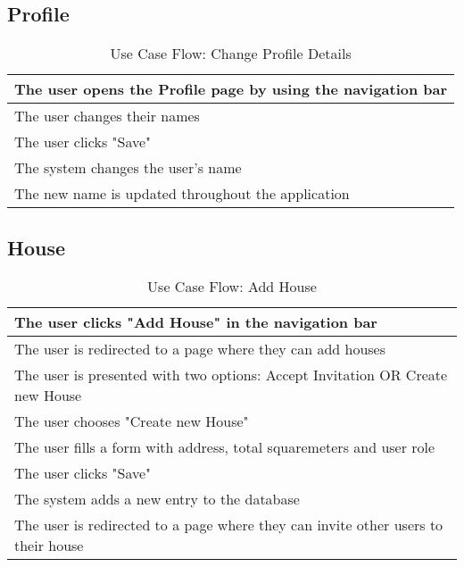 \subsection{Profile}
\begin{table}[H]
  \begin{tabularx}{\linewidth}{|X|}
    \hline
     The user opens the Profile page by using the navigation bar \\
     \hline
     The user changes their names \\
     \hline
     The user clicks "Save" \\
     \hline
     The system changes the user's name \\
     \hline 
     The new name is updated throughout the application \\
     \hline 
  \end{tabularx}
  \caption{Use Case Flow: Change Profile Details}
\end{table}


\subsection{House}
\begin{table}[H]
  \begin{tabularx}{\linewidth}{|X|}
    \hline
     The user clicks "Add House" in the navigation bar \\
     \hline
     The user is redirected to a page where they can add houses \\
     \hline
     The user is presented with two options: Accept Invitation OR Create new House \\
     \hline 
     The user chooses "Create new House" \\
     \hline 
     The user fills a form with address, total squaremeters and user role \\
     \hline
     The user clicks "Save" \\
     \hline  
     The system adds a new entry to the database \\
     \hline  
     The user is redirected to a page where they can invite other users to their house \\
     \hline  
  \end{tabularx}
  \caption{Use Case Flow: Add House}
\end{table}

